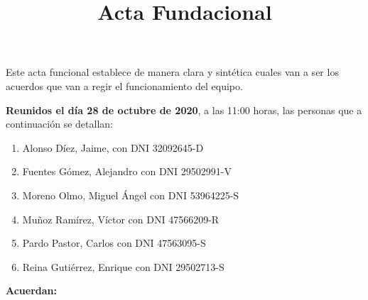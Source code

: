 \documentclass[]{article}
\title{Acta Fundacional}
\date{}
\begin{document}
\maketitle

Este acta funcional establece de manera clara y sintética cuales van a ser los acuerdos que van a regir el funcionamiento del equipo.

\textbf{Reunidos el día 28 de octubre de 2020}, a las 11:00 horas, las personas que a continuación se detallan:

\begin{enumerate}

\item{Alonso Díez, Jaime, con DNI 32092645-D}
\item{Fuentes Gómez, Alejandro con DNI 29502991-V}
\item{Moreno Olmo, Miguel Ángel con DNI 53964225-S}
\item{Muñoz Ramírez, Víctor con DNI 47566209-R}
\item{Pardo Pastor, Carlos con DNI 47563095-S}
\item{Reina Gutiérrez, Enrique con DNI 29502713-S}

\end{enumerate}

\textbf{Acuerdan:}
\end{document}
